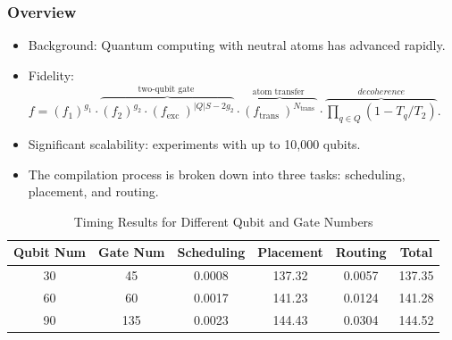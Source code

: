 \documentclass[18 pt]{beamer}
\begin{document}
\begin{frame}
    \frametitle{Overview}
    \begin{itemize}
        \item Background: Quantum computing with neutral atoms has advanced rapidly.
        \item Fidelity: \(f=\left(f_{1}\right)^{g_{1}} \cdot \overbrace{\left(f_{2}\right)^{g_{2}} \cdot\left(f_{\text {exc }}\right)^{|Q| S-2 g_{2}}}^{\text {two-qubit gate }} \cdot \overbrace{\left(f_{\text {trans }}\right)^{N_{\text {trans }}}}^{\text {atom transfer }}\cdot \overbrace{\prod_{q\in Q} (1-T_q/T_2)}^{decoherence}\).
        \item Significant scalability: experiments with up to 10,000 qubits.
        \item The compilation process is broken down into three tasks: scheduling, placement, and routing.
    \end{itemize}
    \begin{table}[h!]
        \centering
        \scriptsize
        \begin{tabular}{|c|c|c|c|c|c|}
        \hline
        \textbf{Qubit Num} & \textbf{Gate Num} & \textbf{Scheduling} & \textbf{Placement} & \textbf{Routing}  & \textbf{Total} \\
        \hline
        30 & 45 & 0.0008 & 137.32 & 0.0057 & 137.35 \\
        \hline
        60 & 60 & 0.0017 & 141.23 & 0.0124 & 141.28 \\
        \hline
        90 & 135 & 0.0023 & 144.43 & 0.0304 & 144.52 \\
        \hline
        \end{tabular}
        \caption{Timing Results for Different Qubit and Gate Numbers}
        \label{table:timing_results}
    \end{table}
\end{frame}
\end{document}
